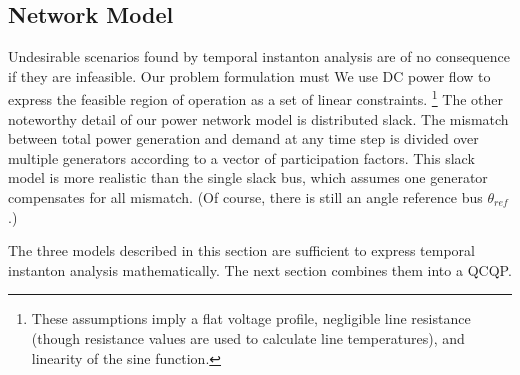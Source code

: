 \documentclass[journal,twoside]{IEEEtran}
\begin{document}
%

\subsection{Network Model}\label{sec:models-network}
Undesirable scenarios found by temporal instanton analysis are of no consequence if they are infeasible. Our problem formulation must We use DC power flow to express the feasible region of operation as a set of linear constraints. \footnote{These assumptions imply a flat voltage profile, negligible line resistance (though resistance values are used to calculate line temperatures), and linearity of the sine function.} The other noteworthy detail of our power network model is distributed slack. The mismatch between total power generation and demand at any time step is divided over multiple generators according to a vector of participation factors. This slack model is more realistic than the single slack bus, which assumes one generator compensates for all mismatch. (Of course, there is still an angle reference bus $\theta_{ref}$.)

The three models described in this section are sufficient to express temporal instanton analysis mathematically. The next section combines them into a QCQP.
\end{document}

